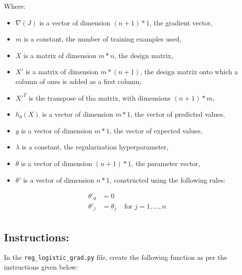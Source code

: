 \documentclass[]{article}
\begin{document}
Where:

\begin{itemize}
\item
  \(\nabla(J)\) is a vector of dimension \((n + 1) * 1\), the gradient
  vector,
\item
  \(m\) is a constant, the number of training examples used,
\item
  \(X\) is a matrix of dimension \(m * n\), the design matrix,
\item
  \(X'\) is a matrix of dimension \(m * (n + 1)\), the design matrix
  onto which a column of ones is added as a first column,
\item
  \(X'^T\) is the transpose of tha matrix, with dimensions
  \((n + 1) * m\),
\item
  \(h_\theta(X)\) is a vector of dimension \(m * 1\), the vector of
  predicted values,
\item
  \(y\) is a vector of dimension \(m * 1\), the vector of expected
  values,
\item
  \(\lambda\) is a constant, the regularization hyperparameter,
\item
  \(\theta\) is a vector of dimension \((n + 1) * 1\), the parameter
  vector,
\item
  \(\theta'\) is a vector of dimension \(n * 1\), constructed using the
  following rules:
\end{itemize}

\large

\[
\begin{matrix}
\theta'_0 & =  0 \\
\theta'_j & =  \theta_j & \text{ for } j = 1, \dots, n\\    
\end{matrix}
\] \normalsize

\hypertarget{instructions-7}{%
\subsection{Instructions:}\label{instructions-7}}

In the \texttt{reg\_logistic\_grad.py} file, create the following
function as per the instructions given below:
\end{document}
